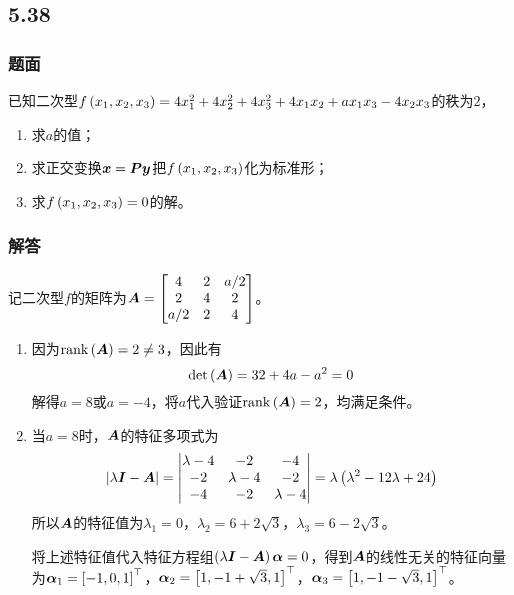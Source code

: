 \documentclass[9pt,xcolor=svgnames]{beamer} %
\begin{document}
\subsection*{5.38}
\begin{frame}
    \frametitle{题面}
    已知二次型\(f\left( x_1,x_2,x_3 \right)=4x_1^2+4x_2^2+4x_3^2+4x_1x_2+ax_1x_3-4x_2x_3\)的秩为\(2\)，
    \begin{enumerate}
        \item 求\(a\)的值；
        \item 求正交变换\(\boldsymbol{x}=\boldsymbol{P}\boldsymbol{y}\)把\(f\left( x_1,x_2,x_3 \right)\)化为标准形；
        \item 求\(f\left( x_1,x_2,x_3 \right)=0\)的解。
    \end{enumerate}
\end{frame}

\begin{frame}[allowframebreaks]
    \frametitle{解答}
    记二次型\(f\)的矩阵为\(\boldsymbol{A}=\begin{bmatrix}4&2&a/2\\2&4&2\\a/2&2&4\end{bmatrix}\)。
    \begin{enumerate}
        \item {
              因为\(\mathrm{rank}\left( \boldsymbol{A} \right)=2\neq3\)，因此有
              \begin{equation*}
                  \mathrm{det}\left( \boldsymbol{A} \right)=32+4a-a^2=0
              \end{equation*}
              解得\(a=8\)或\(a=-4\)，将\(a\)代入验证\(\mathrm{rank}\left( \boldsymbol{A} \right)=2\)，均满足条件。
              }
        \item {
              当\(a=8\)时，\(\boldsymbol{A}\)的特征多项式为
              \begin{equation*}
                  \left|\lambda\boldsymbol{I}-\boldsymbol{A} \right|=\begin{vmatrix}\lambda-4&-2&-4\\-2&\lambda-4&-2\\-4&-2&\lambda-4\end{vmatrix}=\lambda\left( \lambda^2-12\lambda+24 \right)
              \end{equation*}
              所以\(\boldsymbol{A}\)的特征值为\(\lambda_1=0\)，\(\lambda_2=6+2\sqrt{3}\)，\(\lambda_3=6-2\sqrt{3}\)。

              将上述特征值代入特征方程组\(\left( \lambda\boldsymbol{I}-\boldsymbol{A} \right)\boldsymbol{\alpha}=0\)，得到\(\boldsymbol{A}\)的线性无关的特征向量为\(\boldsymbol{\alpha}_1=\left[ -1,0,1 \right]^\top\)，\(\boldsymbol{\alpha}_2=\left[ 1,-1+\sqrt{3},1 \right]^\top\)，\(\boldsymbol{\alpha}_3=\left[ 1,-1-\sqrt{3},1 \right]^\top\)。

}
\end{enumerate}
\end{frame}
\end{document}
